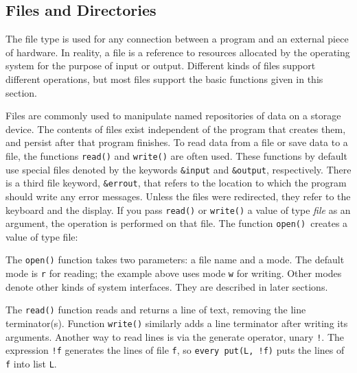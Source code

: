\subsection{Files and Directories}

The file type is used for any connection between a program and an
external piece of hardware. In reality, a file is a
reference to resources allocated by
the operating system for the purpose of input or output. Different
kinds of files support different operations, but most
files support the basic functions given in this section.

Files are commonly used to manipulate named repositories of data on
a storage device. The contents of files exist independent of the
program that creates them, and persist after that program finishes.
To read data from a file or save data to a file, the
functions \texttt{read()} and
\texttt{write()} are often used. These functions by
default use special files denoted by the keywords \texttt{\&input} and \texttt{\&output}, respectively. There is a third file
keyword, \texttt{\&errout}, that refers
to the location to which the program should write any error messages.
Unless the files were redirected, they refer to the
keyboard and the display. If you pass
\texttt{read()} or \texttt{write()} a value of type \textit{file} as an
argument, the operation is performed on that file. The function
\texttt{open()}\texttt{ }creates a value of type file:


\noindent
The \texttt{open()} function takes two parameters: a file
name and a mode. The default mode is
\texttt{{\textquotedbl}r{\textquotedbl}} for reading; the example above
uses mode \texttt{{\textquotedbl}w{\textquotedbl}} for
writing. Other modes denote other kinds of system interfaces.
They are described in later sections.

The \texttt{read()} function reads and returns a line of text, removing the
line terminator(s). Function \texttt{write()}
similarly adds a line terminator after writing its arguments.
Another way to read lines is via the generate operator, unary
\texttt{!}. The expression \texttt{!f} generates the lines of file
\texttt{f}, so \texttt{every put(L, !f)} puts the lines of
\texttt{f} into list \texttt{L}.

